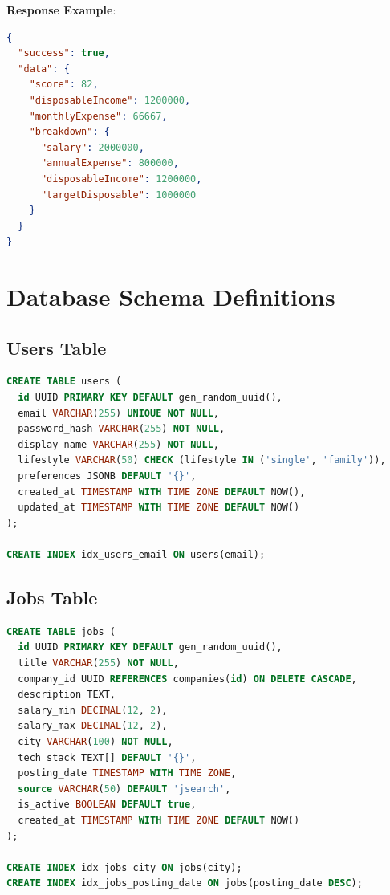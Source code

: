 \documentclass[12pt,a4paper,oneside]{report}
\begin{document}
\textbf{Response Example}:
\begin{lstlisting}[language=json]
{
  "success": true,
  "data": {
    "score": 82,
    "disposableIncome": 1200000,
    "monthlyExpense": 66667,
    "breakdown": {
      "salary": 2000000,
      "annualExpense": 800000,
      "disposableIncome": 1200000,
      "targetDisposable": 1000000
    }
  }
}
\end{lstlisting}

\chapter{Database Schema Definitions}

\section{Users Table}

\begin{lstlisting}[language=sql]
CREATE TABLE users (
  id UUID PRIMARY KEY DEFAULT gen_random_uuid(),
  email VARCHAR(255) UNIQUE NOT NULL,
  password_hash VARCHAR(255) NOT NULL,
  display_name VARCHAR(255) NOT NULL,
  lifestyle VARCHAR(50) CHECK (lifestyle IN ('single', 'family')),
  preferences JSONB DEFAULT '{}',
  created_at TIMESTAMP WITH TIME ZONE DEFAULT NOW(),
  updated_at TIMESTAMP WITH TIME ZONE DEFAULT NOW()
);

CREATE INDEX idx_users_email ON users(email);
\end{lstlisting}

\section{Jobs Table}

\begin{lstlisting}[language=sql]
CREATE TABLE jobs (
  id UUID PRIMARY KEY DEFAULT gen_random_uuid(),
  title VARCHAR(255) NOT NULL,
  company_id UUID REFERENCES companies(id) ON DELETE CASCADE,
  description TEXT,
  salary_min DECIMAL(12, 2),
  salary_max DECIMAL(12, 2),
  city VARCHAR(100) NOT NULL,
  tech_stack TEXT[] DEFAULT '{}',
  posting_date TIMESTAMP WITH TIME ZONE,
  source VARCHAR(50) DEFAULT 'jsearch',
  is_active BOOLEAN DEFAULT true,
  created_at TIMESTAMP WITH TIME ZONE DEFAULT NOW()
);

CREATE INDEX idx_jobs_city ON jobs(city);
CREATE INDEX idx_jobs_posting_date ON jobs(posting_date DESC);
\end{lstlisting}
\end{document}
